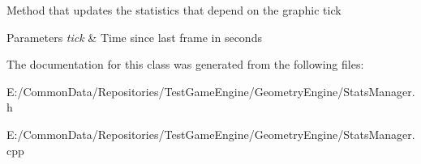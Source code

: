 Method that updates the statistics that depend on the graphic tick 
\begin{DoxyParams}{Parameters}
{\em tick} & Time since last frame in seconds \\
\hline
\end{DoxyParams}


The documentation for this class was generated from the following files\+:\begin{DoxyCompactItemize}
\item 
E\+:/\+Common\+Data/\+Repositories/\+Test\+Game\+Engine/\+Geometry\+Engine/Stats\+Manager.\+h\item 
E\+:/\+Common\+Data/\+Repositories/\+Test\+Game\+Engine/\+Geometry\+Engine/Stats\+Manager.\+cpp\end{DoxyCompactItemize}
